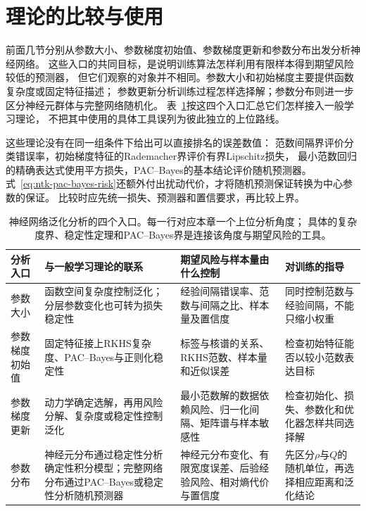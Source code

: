 \FloatBarrier
\section{理论的比较与使用}
\label{sec:deep-theory-comparison}

前面几节分别从参数大小、参数梯度初始值、参数梯度更新和参数分布出发分析神经网络。
这些入口的共同目标，是说明训练算法怎样利用有限样本得到期望风险较低的预测器，
但它们观察的对象并不相同。参数大小和初始梯度主要提供函数复杂度或固定特征描述；
参数更新分析训练过程怎样选择解；参数分布则进一步区分神经元群体与完整网络随机化。
表~\ref{tab:deep-generalization-routes}按这四个入口汇总它们怎样接入一般学习理论，
不把其中使用的具体工具误列为彼此独立的上位路线。

这些理论没有在同一组条件下给出可以直接排名的误差数值：
范数间隔界评价分类错误率，初始梯度特征的Rademacher界评价有界Lipschitz损失，
最小范数回归的精确表达式使用平方损失，PAC--Bayes的基本结论评价随机预测器。
式~\eqref{eq:ntk-pac-bayes-risk}还额外付出扰动代价，才将随机预测保证转换为中心参数的保证。
比较时应先统一损失、预测器和置信要求，再比较上界。

\begin{table}[!htb]
 \centering
 \small
 \begin{tabular}{p{24mm}p{43mm}p{46mm}p{38mm}}
 \toprule
 分析入口 & 与一般学习理论的联系 & 期望风险与样本量由什么控制 & 对训练的指导\\
 \midrule
 参数大小 & 函数空间复杂度控制泛化；分层参数变化也可转为损失稳定性 & 经验间隔错误率、范数与间隔之比、样本量及置信度 & 同时控制范数与经验间隔，不能只缩小权重\\
 参数梯度初始值 & 固定特征接上RKHS复杂度、PAC--Bayes与正则化稳定性 & 标签与核谱的关系、RKHS范数、样本量和近似误差 & 检查初始特征能否以较小范数表达目标\\
 参数梯度更新 & 动力学确定选解，再用风险分解、复杂度或稳定性控制泛化 & 最小范数解的数据依赖风险、归一化间隔、矩阵谱与样本敏感性 & 检查初始化、损失、参数化和优化器怎样共同选择解\\
 参数分布 & 神经元分布通过稳定性分析确定性积分模型；完整网络分布通过PAC--Bayes或稳定性分析随机预测器 & 神经元分布变化、有限宽度误差、后验经验风险、相对熵代价与置信度 & 先区分$\rho$与$Q$的随机单位，再选择相应距离和泛化结论\\
 \bottomrule
 \end{tabular}
 \caption{神经网络泛化分析的四个入口。每一行对应本章一个上位分析角度；
 具体的复杂度界、稳定性定理和PAC--Bayes界是连接该角度与期望风险的工具。}
 \label{tab:deep-generalization-routes}
\end{table}

